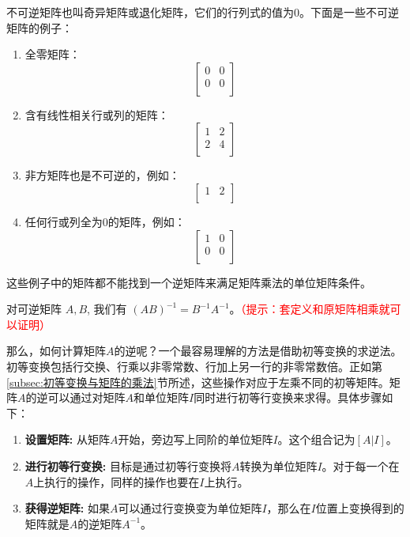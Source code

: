 不可逆矩阵也叫奇异矩阵或退化矩阵，它们的行列式的值为0。下面是一些不可逆矩阵的例子：

\begin{enumerate}
\item 全零矩阵：
   \[
   \begin{bmatrix}
   0 & 0 \\
   0 & 0 \\
   \end{bmatrix}
   \]

\item 含有线性相关行或列的矩阵：
   \[
   \begin{bmatrix}
   1 & 2 \\
   2 & 4 \\
   \end{bmatrix}
   \]

\item 非方矩阵也是不可逆的，例如：
   \[
   \begin{bmatrix}
   1 & 2 \\
   \end{bmatrix}
   \]

\item 任何行或列全为0的矩阵，例如：
   \[
   \begin{bmatrix}
   1 & 0 \\
   0 & 0 \\
   \end{bmatrix}
   \]
\end{enumerate}

这些例子中的矩阵都不能找到一个逆矩阵来满足矩阵乘法的单位矩阵条件。


\begin{theorem}[矩阵的逆的运算性质]
    对可逆矩阵 $A, B$, 我们有 $(A B)^{-1}=B^{-1} A^{-1}$。\textcolor{red}{（提示：套定义和原矩阵相乘就可以证明）}
\end{theorem}

那么，如何计算矩阵\(A\)的逆呢？一个最容易理解的方法是借助初等变换的求逆法。初等变换包括行交换、行乘以非零常数、行加上另一行的非零常数倍。正如第\ref{subsec:初等变换与矩阵的乘法}节所述，这些操作对应于左乘不同的初等矩阵。矩阵\(A\)的逆可以通过对矩阵\(A\)和单位矩阵\(I\)同时进行初等行变换来求得。具体步骤如下：

\begin{enumerate}
    \item \textbf{设置矩阵:} 从矩阵\(A\)开始，旁边写上同阶的单位矩阵\(I\)。这个组合记为\([A|I]\)。
    \item \textbf{进行初等行变换:} 目标是通过初等行变换将\(A\)转换为单位矩阵\(I\)。对于每一个在\(A\)上执行的操作，同样的操作也要在\(I\)上执行。
    \item \textbf{获得逆矩阵:} 如果\(A\)可以通过行变换变为单位矩阵\(I\)，那么在\(I\)位置上变换得到的矩阵就是\(A\)的逆矩阵\(A^{-1}\)。
\end{enumerate}

